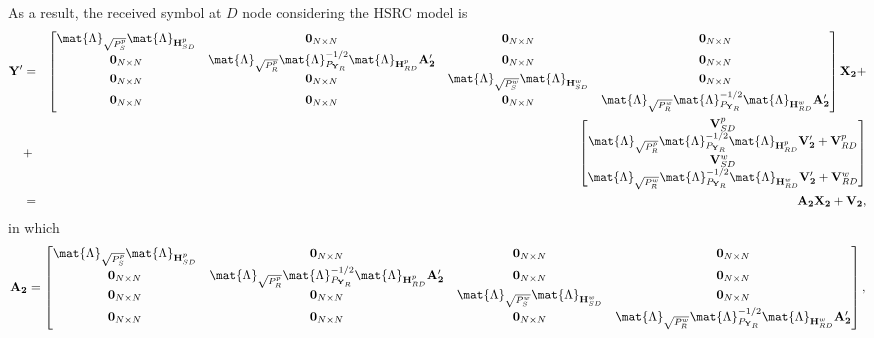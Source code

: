 As a result, the received symbol at $D$ node considering the \ac{HSRC} model is
\begin{eqnarray}
\mathbf{Y'} & = & \begin{bmatrix} \mat{\Lambda}_{\sqrt{P_{S}^{p}}} \mat{\Lambda}_{\mathbf{H}_{SD}^p} & \mathbf{0}_{N \times N} & \mathbf{0}_{N \times N} & \mathbf{0}_{N \times N} \\ \mathbf{0}_{N \times N} & \mat{\Lambda}_{\sqrt{P_{R}^{p}}} \mat{\Lambda}_{P_{\mathbf{Y}_{R}}}^{-1/2} \mat{\Lambda}_{\mathbf{H}_{RD}^p} \mathbf{A'_2} & \mathbf{0}_{N \times N} & \mathbf{0}_{N \times N} \\ \mathbf{0}_{N \times N} & \mathbf{0}_{N \times N} & \mat{\Lambda}_{\sqrt{P_{S}^{w}}} \mat{\Lambda}_{\mathbf{H}_{SD}^w} & \mathbf{0}_{N \times N} \\ \mathbf{0}_{N \times N} & \mathbf{0}_{N \times N} & \mathbf{0}_{N \times N} & \mat{\Lambda}_{\sqrt{P_{R}^{w}}} \mat{\Lambda}_{P_{\mathbf{Y}_{R}}}^{-1/2} \mat{\Lambda}_{\mathbf{H}_{RD}^w} \mathbf{A'_2} \end{bmatrix} \mathbf{X_2} + \nonumber\\
& + & \begin{bmatrix} \mathbf{V}_{SD}^p \\ \mat{\Lambda}_{\sqrt{P_{R}^{p}}} \mat{\Lambda}_{P_{\mathbf{Y}_{R}}}^{-1/2} \mat{\Lambda}_{\mathbf{H}_{RD}^p} \mathbf{V'_2} + \mathbf{V}_{RD}^{p} \\ \mathbf{V}_{SD}^w \\ \mat{\Lambda}_{\sqrt{P_{R}^{w}}} \mat{\Lambda}_{P_{\mathbf{Y}_{R}}}^{-1/2} \mat{\Lambda}_{\mathbf{H}_{RD}^w} \mathbf{V'_2} + \mathbf{V}_{RD}^{w} \end{bmatrix} \nonumber\\
& = & \mathbf{A_2} \mathbf{X_2} + \mathbf{V_2},
\end{eqnarray}
in which
\begin{equation}
\mathbf{A_2} = \begin{bmatrix} \mat{\Lambda}_{\sqrt{P_{S}^{p}}} \mat{\Lambda}_{\mathbf{H}_{SD}^p} & \mathbf{0}_{N \times N} & \mathbf{0}_{N \times N} & \mathbf{0}_{N \times N} \\ \mathbf{0}_{N \times N} & \mat{\Lambda}_{\sqrt{P_{R}^{p}}} \mat{\Lambda}_{P_{\mathbf{Y}_{R}}}^{-1/2} \mat{\Lambda}_{\mathbf{H}_{RD}^p} \mathbf{A'_2} & \mathbf{0}_{N \times N} & \mathbf{0}_{N \times N} \\ \mathbf{0}_{N \times N} & \mathbf{0}_{N \times N} & \mat{\Lambda}_{\sqrt{P_{S}^{w}}} \mat{\Lambda}_{\mathbf{H}_{SD}^w} & \mathbf{0}_{N \times N} \\ \mathbf{0}_{N \times N} & \mathbf{0}_{N \times N} & \mathbf{0}_{N \times N} & \mat{\Lambda}_{\sqrt{P_{R}^{w}}} \mat{\Lambda}_{P_{\mathbf{Y}_{R}}}^{-1/2} \mat{\Lambda}_{\mathbf{H}_{RD}^w} \mathbf{A'_2} \end{bmatrix},
\end{equation}
